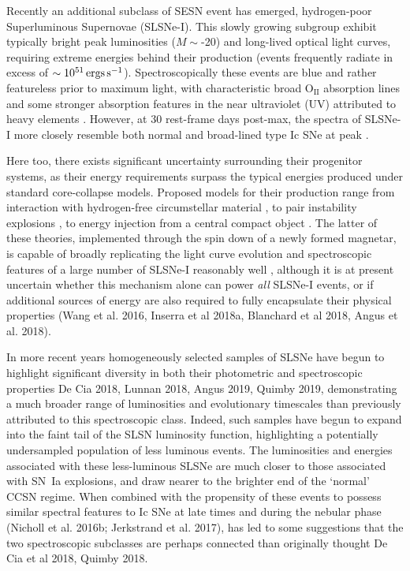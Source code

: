 \documentclass[a4paper,fleqn,usenatbib]{mnras}
\newcommand{\angus}[1]{\color{JungleGreen}#1\color{black}}
\begin{document}
Recently an additional subclass of SESN event has emerged, hydrogen-poor Superluminous Supernovae (SLSNe-I). This slowly growing subgroup exhibit typically bright peak luminosities ($M\sim$-20) and long-lived optical light curves, requiring extreme energies behind their production (events frequently radiate in excess of $\sim10^{51}\,{\rm ergs\,s^{-1}}$). Spectroscopically these events are blue
and rather featureless prior to maximum light, with characteristic broad O$_{\mathrm{II}}$ absorption lines {\angus{{Quimby et al. 2011}}} and some stronger absorption features in the near ultraviolet (UV) attributed to heavy elements {\angus{{(see more detailed discussion in Quimby et al. 2018)}}}. However, at 30 rest-frame days post-max, the spectra of SLSNe-I more closely resemble both normal and broad-lined type Ic SNe at peak {\angus{{(Pastorello et al. 2010; Liu et al. 2017)}}}.

Here too, there exists significant uncertainty surrounding their progenitor systems, as their energy requirements surpass the typical energies produced under standard core-collapse models. Proposed models for their production range from interaction with hydrogen-free circumstellar material \citep{Chevalier2011,Chatzopoulos2013,Sorokina2016}, to pair instability explosions \citep{Woosley2007,Yan2015}, to energy injection from a central compact object \citep{Kasen2010,Woosley2010,Inserra2013}. The latter of these theories, implemented through the spin down of a newly formed magnetar, is capable of broadly replicating the light curve evolution and spectroscopic features of a large number of SLSNe-I reasonably well \citep{Dessart2012,Inserra2013,Nicholl2013,Mazzali2016,Nicholl2017B}, although it is at present uncertain whether this mechanism alone can power {\textit{all}} SLSNe-I events, or if additional sources of energy are also required to fully encapsulate their physical properties \angus{(Wang et al. 2016, Inserra et al 2018a, Blanchard et al 2018, Angus et al. 2018)}. 

In more recent years homogeneously selected samples of SLSNe have begun to highlight significant diversity in both their photometric and spectroscopic properties \angus{De Cia 2018, Lunnan 2018, Angus 2019, Quimby 2019}, demonstrating a much broader range of luminosities and evolutionary timescales than previously attributed to this spectroscopic class. Indeed, such samples have begun to expand into the faint tail of the SLSN luminosity function, highlighting a potentially undersampled population of less luminous events. The luminosities and energies associated with these less-luminous SLSNe are much closer to those associated with SN~Ia explosions, and draw nearer to the brighter end of the \lq normal\rq~ CCSN regime. When combined with the propensity of these events to possess similar spectral features to Ic SNe at late times and during the nebular phase {\angus{(Nicholl et al. 2016b; Jerkstrand et al. 2017)}}, has led to some suggestions that the two spectroscopic subclasses are perhaps connected than originally thought \angus{De Cia et al 2018, Quimby 2018}. 
\end{document}
